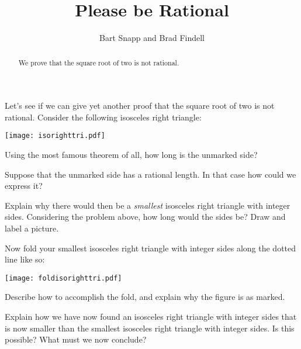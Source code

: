 \documentclass[nooutcomes]{ximera}
\title{Please be Rational}
\author{Bart Snapp and Brad Findell}
\begin{document}
\begin{abstract}
  We prove that the square root of two is not rational.
\end{abstract}
\maketitle

Let's see if we can give yet another proof that the square root of two
is not rational. Consider the following isosceles right triangle:
\begin{image}
\texttt{[image: isorighttri.pdf]}
\end{image}
\begin{problem}
Using the most famous theorem of all, how long is the unmarked side?
\end{problem}

\begin{problem} 
Suppose that the unmarked side has a rational length. In that case how
could we express it?
\end{problem}

\begin{problem}
Explain why there would then be a \textit{smallest} isosceles right
triangle with integer sides. Considering the problem above, how long
would the sides be? Draw and label a picture.
\end{problem}

\newpage
\begin{problem}
Now fold your smallest isosceles right triangle with integer sides
along the dotted line like so:
\begin{image}
\texttt{[image: foldisorighttri.pdf]}
\end{image}
Describe how to accomplish the fold, and explain why the figure is as marked.  
\end{problem}
\vspace{1in}

\begin{problem}
Explain how we have now found an isosceles right triangle with integer
sides that is now smaller than the smallest isosceles right triangle
with integer sides. Is this possible? What must we now conclude?
\end{problem}
\end{document}
